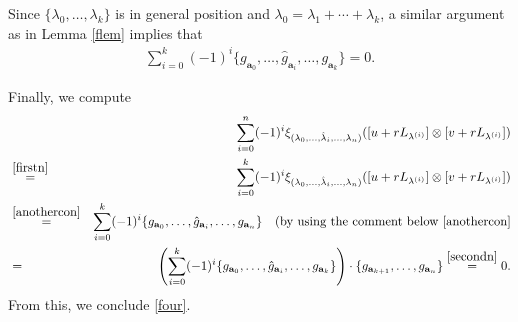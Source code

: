 \documentclass[12pt,amstex,amssymb]{article}
\theoremstyle{plain}
\theoremstyle{definition}
\def\Q{{\mathbb Q}}
\def\l{\lambda}
\newcommand{\be}{\begin{eqnarray*}}
\newcommand{\ee}{\end{eqnarray*}}
\newcommand{\bea}{\begin{eqnarray}}
\newcommand{\eea}{\end{eqnarray}}
\newcommand{\ba}{\mathbf{a}}
\begin{document}
{Since $\{\l_0, \ldots, \l_k\}$ is in general position and $\l_0=\l_1 +\cdots + \l_k$, a similar argument as in Lemma \ref{flem} implies that
\bea \label{secondn}
\sum_{i=0}^k (-1)^i  \{g_{\ba_{0}}, \ldots, \hat g_{\ba_i}, \ldots, g_{\ba_k} \}=0.
\eea

Finally, we compute
\be
&&\sum_{i=0}^n (-1)^i\xi_{(\lambda_0,\ldots,\hat \lambda_i,\ldots,\lambda_n)} ([u+rL_{ \l^{(i)}}]\otimes [v+rL_{ \l^{(i)}} ])\\
&\stackrel{\eqref{firstn}}{=}&\sum_{i=0}^k (-1)^i \xi_{(\l_0, \ldots, \hat \l_i, \ldots, \l_{n})}([u+rL_{ \l^{(i)}}]\otimes [v+rL_{ \l^{(i)}} ]) \\
&\stackrel{\eqref{anothercon}}{=}&\sum_{i=0}^k (-1)^i  \{g_{\ba_{0}}, \ldots, \hat g_{\ba_i}, \ldots, g_{\ba_n} \} \quad (\text {by using the comment below \eqref{anothercon}} \\
&=&\left( \sum_{i=0}^k (-1)^i  \{g_{\ba_{0}}, \ldots, \hat g_{\ba_i}, \ldots, g_{\ba_k} \}\right)\cdot\{g_{\ba_{k+1}}, \ldots, g_{\ba_n} \} 
\stackrel{\eqref{secondn}}{=}0.
\ee
From this, we conclude \eqref{four}.



}
\end{document}
